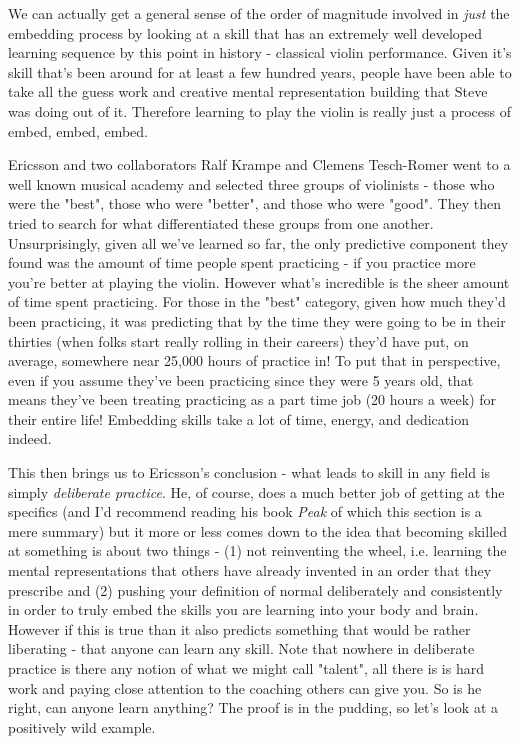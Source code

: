 \documentclass[11pt]{book}
\begin{document}
We can actually get a general sense of the order of magnitude involved in \textit{just} the embedding process by looking at a skill that has an extremely well developed learning sequence by this point in history - classical violin performance. Given it's skill that's been around for at least a few hundred years, people have been able to take all the guess work and creative mental representation building that Steve was doing out of it. Therefore learning to play the violin is really just a process of embed, embed, embed. 
\newline

Ericsson and two collaborators Ralf Krampe and Clemens Tesch-Romer went to a well known musical academy and selected three groups of violinists - those who were the "best", those who were "better", and those who were "good". They then tried to search for what differentiated these groups from one another. Unsurprisingly, given all we've learned so far, the only predictive component they found was the amount of time people spent practicing - if you practice more you're better at playing the violin. However what's incredible is the sheer amount of time spent practicing. For those in the "best" category, given how much they'd been practicing, it was predicting that by the time they were going to be in their thirties (when folks start really rolling in their careers) they'd have put, on average, somewhere near 25,000 hours of practice in! To put that in perspective, even if you assume they've been practicing since they were 5 years old, that means they've been treating practicing as a part time job (20 hours a week) for their entire life! Embedding skills take a lot of time, energy, and dedication indeed.
\newline

This then brings us to Ericsson's conclusion - what leads to skill in any field is simply \textit{deliberate practice}. He, of course, does a much better job of getting at the specifics (and I'd recommend reading his book \textit{Peak} \cite{ericsson} of which this section is a mere summary) but it more or less comes down to the idea that becoming skilled at something is about two things - (1) not reinventing the wheel, i.e. learning the mental representations that others have already invented in an order that they prescribe and (2) pushing your definition of normal deliberately and consistently in order to truly embed the skills you are learning into your body and brain. However if this is true than it also predicts something that would be rather liberating - that anyone can learn any skill. Note that nowhere in deliberate practice is there any notion of what we might call "talent", all there is is hard work and paying close attention to the coaching others can give you. So is he right, can anyone learn anything? The proof is in the pudding, so let's look at a positively wild example.
\newline
\end{document}

